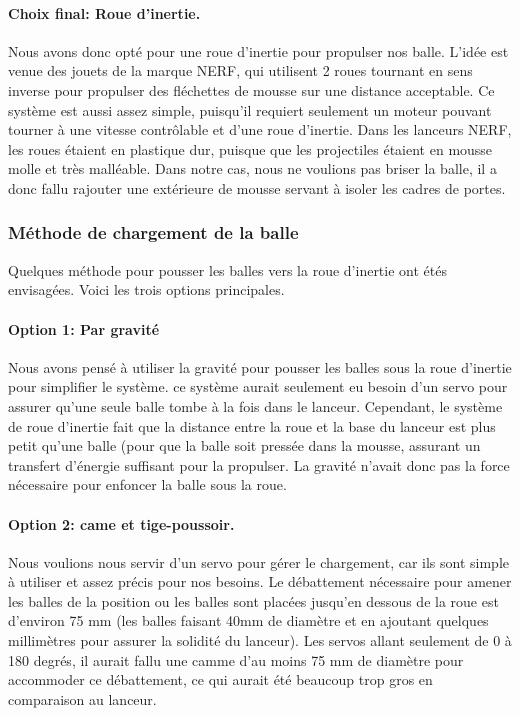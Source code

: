 \paragraph{Choix final: Roue d’inertie.}
Nous avons donc opté pour une roue d’inertie pour propulser nos balle.
L’idée est venue des jouets de la marque NERF, qui utilisent 2 roues tournant en sens inverse pour propulser des fléchettes de mousse sur une distance acceptable.
Ce système est aussi assez simple, puisqu’il requiert seulement un moteur pouvant tourner à une vitesse contrôlable et d’une roue d’inertie.
Dans les lanceurs NERF, les roues étaient en plastique dur, puisque que les projectiles étaient en mousse molle et très malléable.
Dans notre cas, nous ne voulions pas briser la balle, il a donc fallu rajouter une extérieure de mousse servant à isoler les cadres de portes.


\subsubsection{Méthode de chargement de la balle}
Quelques méthode pour pousser les balles vers la roue d’inertie ont étés envisagées.
Voici les trois options principales.

\paragraph{Option 1: Par gravité}
Nous avons pensé à utiliser la gravité pour pousser les balles sous la roue d’inertie pour simplifier le système.
ce système aurait seulement eu besoin d’un servo pour assurer qu’une seule balle tombe à la fois dans le lanceur.
Cependant, le système de roue d’inertie fait que la distance entre la roue et la base du lanceur est plus petit qu’une balle (pour que la balle soit pressée dans la mousse, assurant un transfert d’énergie suffisant pour la propulser.
La gravité n’avait donc pas la force nécessaire pour enfoncer la balle sous la roue.

\paragraph{Option 2: came et tige-poussoir.}
Nous voulions nous servir d’un servo pour gérer le chargement, car ils sont simple à utiliser et assez précis pour nos besoins.
Le débattement nécessaire pour amener les balles de la position ou les balles sont placées jusqu’en dessous de la roue est d’environ 75 mm (les balles faisant 40mm de diamètre et en ajoutant quelques millimètres pour assurer la solidité du lanceur).
Les servos allant seulement de 0 à 180 degrés, il aurait fallu une camme d’au moins 75 mm de diamètre pour accommoder ce débattement, ce qui aurait été beaucoup trop gros en comparaison au lanceur.

